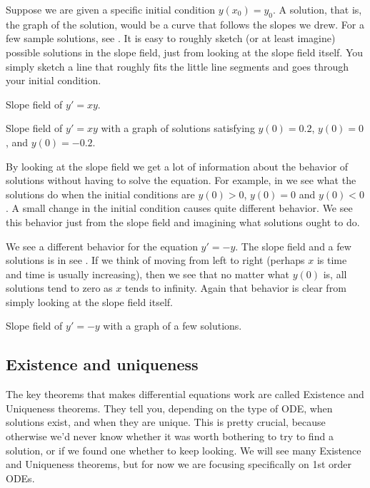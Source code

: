 Suppose we are given a specific initial condition $y(x_0) = y_0$.
A solution, that is, the graph of the solution, would be a curve
that follows the slopes we drew.
For a few sample
solutions, see .  It is easy to roughly sketch
(or at least imagine)
possible solutions in the slope field, just from looking at the slope field
itself.  You simply sketch a line that roughly fits the little line segments
and goes through your initial condition.

\begin{myfig}
\parbox[t]{3.0in}{
 \capstart
 \caption{Slope field of $y' = xy$.\label{1.3:fig1}}
}
\quad
\parbox[t]{3.0in}{
 \capstart
 \caption{Slope field of $y' = xy$ with a graph of solutions satisfying
 $y(0) = 0.2$, $y(0) = 0$, and $y(0) = -0.2$.\label{1.3:fig2}}
}
\end{myfig}

By looking at the slope field we get a lot of information
about the behavior of solutions without having to solve
the equation.  For
example, in  we see what the solutions do when the initial conditions
are $y(0) > 0$, $y(0) = 0$ and $y(0) < 0$.
A small change in the
initial condition causes quite different behavior.
We see this behavior just
from the slope field and imagining what solutions ought to do.

We see a different behavior for the equation
$y' = -y$.  The slope field and a few solutions is in
see .
If we think of moving from left to right (perhaps $x$ is time
and time is usually increasing), then
we see that no matter what $y(0)$ is, all solutions tend to zero as $x$
tends to infinity.
Again that behavior is clear from simply
looking at the slope field itself.

\begin{myfig}
\capstart
{}
\caption{Slope field of $y' = -y$ with a graph of a few solutions.\label{1.3:fig3}}
\end{myfig}

\subsection{Existence and uniqueness}

\begin{video}
    The key theorems that makes differential equations work are called Existence and Uniqueness theorems. They tell you, depending on the type of ODE, when solutions exist, and when they are unique. This is pretty crucial, because otherwise we'd never know whether it was worth bothering to try to find a solution, or if we found one whether to keep looking. We will see many Existence and Uniqueness theorems, but for now we are focusing specifically on 1st order ODEs. 
\end{video}

